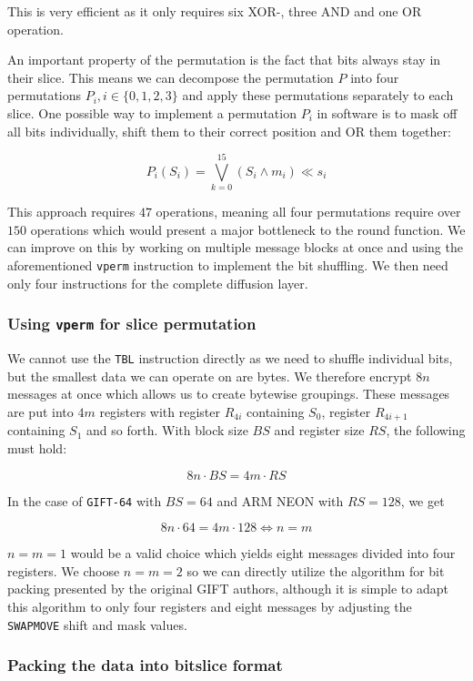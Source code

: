 This is very efficient as it only requires six XOR-, three AND and one OR
operation.

An important property of the permutation is the fact that bits always stay in
their slice. This means we can decompose the permutation $P$ into four
permutations $P_i,i\in\{0,1,2,3\}$ and apply these permutations
separately to each slice. One possible way to implement a permutation $P_i$ in
software is to mask off all bits individually, shift them to their correct
position and OR them together:

\[
    P_i(S_i)=\bigvee_{k=0}^{15}{(S_i\land m_i) \ll s_i}
\]

This approach requires $47$ operations, meaning all four permutations require
over $150$ operations which would present a major bottleneck to the round
function. We can improve on this by working on multiple message blocks at once
and using the aforementioned \texttt{vperm} instruction to implement the bit
shuffling. We then need only four instructions for the complete diffusion
layer.

\subsubsection{Using \texttt{vperm} for slice permutation}

We cannot use the \texttt{TBL} instruction directly as we need to shuffle
individual bits, but the smallest data we can operate on are bytes. We
therefore encrypt $8n$ messages at once which allows us to create bytewise
groupings. These messages are put into $4m$ registers with register $R_{4i}$
containing $S_0$, register $R_{4i+1}$ containing $S_1$ and so forth. With block
size $BS$ and register size $RS$, the following must hold:

\[
    8n\cdot BS=4m\cdot RS
\]

In the case of \texttt{GIFT-64} with $BS=64$ and ARM NEON with $RS=128$, we get

\[
    8n\cdot 64=4m\cdot 128\Leftrightarrow n=m
\]

$n=m=1$ would be a valid choice which yields eight messages divided into four
registers. We choose $n=m=2$ so we can directly utilize the algorithm for bit
packing presented by the original GIFT authors, although it is simple to adapt
this algorithm to only four registers and eight messages by adjusting the
\texttt{SWAPMOVE} shift and mask values.

\subsubsection{Packing the data into bitslice format}

